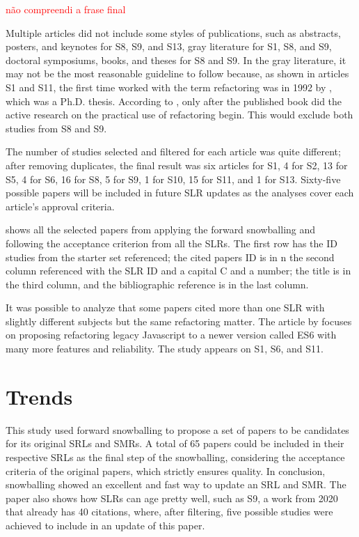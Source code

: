 \textcolor{red}{não compreendi a frase final}

Multiple articles did not include some styles of publications, such as abstracts, posters, and keynotes for S8, S9, and S13, gray literature for S1, S8, and S9, doctoral symposiums, books, and theses for S8 and S9. In the gray literature, it may not be the most reasonable guideline to follow because, as shown in articles S1 and S11, the first time worked with the term refactoring was in 1992 by \textcite{Opdyke1992}, which was a Ph.D. thesis. According to \textcite{Buriakovskyi2018}, only after the published book \textcite{fowler2018refactoring} did the active research on the practical use of refactoring begin. This would exclude both studies from S8 and S9.

The number of studies selected and filtered for each article was quite different; after removing duplicates, the final result was six articles for S1, 4 for S2, 13 for S5, 4 for S6, 16 for S8, 5 for S9, 1 for S10, 15 for S11, and 1 for S13. Sixty-five possible papers will be included in future SLR updates as the analyses cover each article's approval criteria.

  shows all the selected papers from applying the forward snowballing and following the acceptance criterion from all the SLRs. The first row has the ID studies from the starter set referenced; the cited papers ID is in n the second column referenced with the SLR ID and a capital C and a number; the title is in the third column, and the bibliographic reference is in the last column.



It was possible to analyze that some papers cited more than one SLR with slightly different subjects but the same refactoring matter. The article by \textcite{Paltoglou2021} focuses on proposing refactoring legacy Javascript to a newer version called ES6 with many more features and reliability. The study appears on S1, S6, and S11.


\section{Trends}
\label{sec-trends}
This study used forward snowballing to propose a set of papers to be candidates for its original SRLs and SMRs.
A total of 65 papers could be included in their respective SRLs as the final step of the snowballing, considering the acceptance criteria of the original papers, which strictly ensures quality. In conclusion, snowballing showed an excellent and fast way to update an SRL and SMR.
The paper also shows how SLRs can age pretty well, such as S9, a work from 2020 that already has 40 citations, where, after filtering, five possible studies were achieved to include in an update of this paper.

